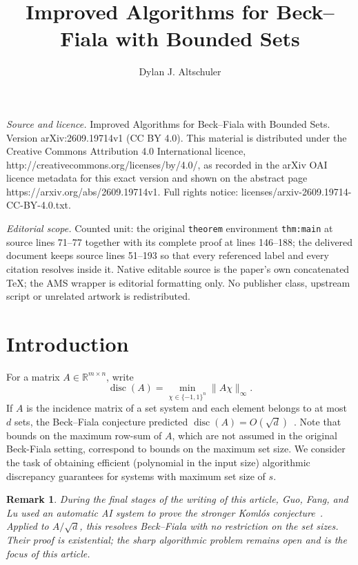 \documentclass[10pt,a4paper]{amsart}
\newtheorem{remark}[theorem]{Remark}
\DeclareMathOperator{\disc}{disc}
\newcommand{\R}{\mathbb R}
\newcommand{\norm}[1]{\lVert#1\rVert}
\begin{document}
\title[Improved Algorithms for Beck--Fiala with Bounded Sets]{Improved Algorithms for Beck--Fiala with Bounded Sets}
\author{Dylan J. Altschuler}
\date{}
\maketitle
\noindent\emph{Source and licence.} Improved Algorithms for Beck--Fiala with Bounded Sets. Version arXiv:2609.19714v1 (CC BY 4.0). This material is distributed under the Creative Commons Attribution 4.0 International licence, http://creativecommons.org/licenses/by/4.0/, as recorded in the arXiv OAI licence metadata for this exact version and shown on the abstract page https://arxiv.org/abs/2609.19714v1. Full rights notice: licenses/arxiv-2609.19714-CC-BY-4.0.txt.\par\smallskip
\noindent\textit{Editorial scope.} Counted unit: the original \texttt{theorem} environment \texttt{thm:main} at source lines 71--77 together with its complete proof at lines 146--188; the delivered document keeps source lines 51--193 so that every referenced label and every citation resolves inside it. Native editable source is the paper's own concatenated TeX; the AMS wrapper is editorial formatting only. No publisher class, upstream script or unrelated artwork is redistributed.
\section{Introduction}

For a matrix $A\in\R^{m\times n}$, write
\[ \disc(A)=\min_{\chi\in\{-1,1\}^n}\norm{A\chi}_\infty. \]
If $A$ is the incidence matrix of a set system and each element belongs to at most $d$ sets, the Beck--Fiala conjecture predicted $\disc(A)=O(\sqrt d)$~\cite{BF}. Note that bounds on the maximum row-sum of $A$, which are not assumed in the original Beck-Fiala setting, correspond to bounds on the maximum set size. We consider the task of obtaining efficient (polynomial in the input size) algorithmic discrepancy guarantees for systems with maximum set size of $s$.

\begin{remark}
During the final stages of the writing of this article, Guo, Fang, and Lu used an automatic AI system to prove the stronger Koml\'os conjecture~\cite{GFL}.  Applied to $A/\sqrt d$, this resolves Beck--Fiala with no restriction on the set sizes.  Their proof is existential; the sharp algorithmic problem remains open and is the focus of this article.
\end{remark}
\end{document}
